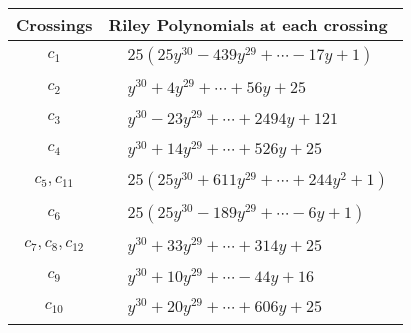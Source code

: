 \documentclass[1p]{elsarticle_modified}
\theoremstyle{definition}
\begin{document}
\begin{tabular}{m{50pt}|m{274pt}}
Crossings & \hspace{64pt}Riley Polynomials at each crossing \\
\hline $$\begin{aligned}c_{1}\end{aligned}$$&$\begin{aligned}
&25(25 y^{30}-439 y^{29}+\cdots-17 y+1)
\end{aligned}$\\
\hline $$\begin{aligned}c_{2}\end{aligned}$$&$\begin{aligned}
&y^{30}+4 y^{29}+\cdots+56 y+25
\end{aligned}$\\
\hline $$\begin{aligned}c_{3}\end{aligned}$$&$\begin{aligned}
&y^{30}-23 y^{29}+\cdots+2494 y+121
\end{aligned}$\\
\hline $$\begin{aligned}c_{4}\end{aligned}$$&$\begin{aligned}
&y^{30}+14 y^{29}+\cdots+526 y+25
\end{aligned}$\\
\hline $$\begin{aligned}c_{5},c_{11}\end{aligned}$$&$\begin{aligned}
&25(25 y^{30}+611 y^{29}+\cdots+244 y^2+1)
\end{aligned}$\\
\hline $$\begin{aligned}c_{6}\end{aligned}$$&$\begin{aligned}
&25(25 y^{30}-189 y^{29}+\cdots-6 y+1)
\end{aligned}$\\
\hline $$\begin{aligned}c_{7},c_{8},c_{12}\end{aligned}$$&$\begin{aligned}
&y^{30}+33 y^{29}+\cdots+314 y+25
\end{aligned}$\\
\hline $$\begin{aligned}c_{9}\end{aligned}$$&$\begin{aligned}
&y^{30}+10 y^{29}+\cdots-44 y+16
\end{aligned}$\\
\hline $$\begin{aligned}c_{10}\end{aligned}$$&$\begin{aligned}
&y^{30}+20 y^{29}+\cdots+606 y+25
\end{aligned}$\\
\hline
\end{tabular}\\~\\
\end{document}
